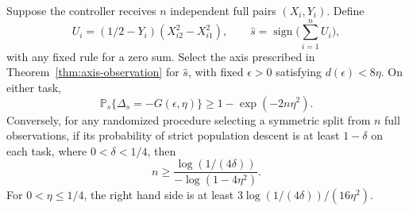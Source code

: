 \begin{theorem}
\label{thm:axis-samples}
Suppose the controller receives $n$ independent full pairs $(X_i,Y_i)$.
Define
\[
 U_i=(1/2-Y_i)(X_{i2}^2-X_{i1}^2),\qquad
 \widehat s=\operatorname{sign}\Big(\sum_{i=1}^n U_i\Big),
\]
with any fixed rule for a zero sum. Select the axis prescribed in
Theorem~\ref{thm:axis-observation} for $\widehat s$, with fixed
$\epsilon>0$ satisfying $d(\epsilon)<8\eta$. On either task,
\begin{equation}
 \mathbb P_s\{\Delta_s=-G(\epsilon,\eta)\}
 \ge1-\exp(-2n\eta^2).
 \label{eq:axis-sample-upper}
\end{equation}
Conversely, for any randomized procedure selecting a symmetric split
from $n$ full observations, if its probability of strict population
descent is at least $1-\delta$ on each task, where $0<\delta<1/4$,
then
\begin{equation}
 n\ge\frac{\log(1/(4\delta))}{-\log(1-4\eta^2)}.
 \label{eq:axis-sample-lower}
\end{equation}
For $0<\eta\le1/4$, the right hand side is at least
$3\log(1/(4\delta))/(16\eta^2)$.
\end{theorem}
